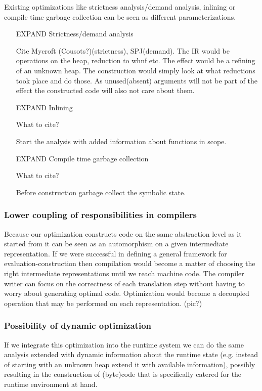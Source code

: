 \documentclass[a4paper]{article}
\begin{document}
Existing optimizations like strictness analysis/demand analysis, inlining or compile time garbage collection can be seen as different parameterizations.

\begin{itemize}
\item [EXPAND]Strictness/demand analysis

Cite Mycroft (Cousots?)(strictness), SPJ(demand). The IR would be operations on the heap, reduction to whnf etc. The effect would be a refining of an unknown heap. The construction would simply look at what reductions took place and do those. As unused(absent) arguments will not be part of the effect the constructed code will also not care about them.

\item [EXPAND]Inlining

What to cite?

Start the analysis with added information about functions in scope.

\item [EXPAND]Compile time garbage collection

What to cite?

Before construction garbage collect the symbolic state.

\end{itemize}

\subsubsection*{Lower coupling of responsibilities in compilers}

Because our optimization constructs code on the same abstraction level as it started from it can be seen as an automorphism on a given intermediate representation. If we were successful in defining a general framework for evaluation-construction then compilation would become a matter of choosing the right intermediate representations until we reach machine code. The compiler writer can focus on the correctness of each translation step without having to worry about generating optimal code. Optimization would become a decoupled operation that may be performed on each representation. (pic?)

\subsubsection*{Possibility of dynamic optimization}

If we integrate this optimization into the runtime system we can do the same analysis extended with dynamic information about the runtime state (e.g. instead of starting with an unknown heap extend it with available information), possibly resulting in the construction of (byte)code that is specifically catered for the runtime environment at hand.
\end{document}
